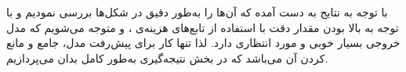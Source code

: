 
با توجه به نتایج به دست آمده که آن‌ها را به‌طور دقیق در شکل‌ها بررسی نمودیم و با توجه به بالا بودن مقدار دقت با استفاده از تابع‌های هزینه‌ی 
،
و 
متوجه می‌شویم که مدل خروجی بسیار خوبی و مورد انتظاری دارد. لذا تنها کار برای پیش‌رفت مدل، جامع و مانع کردن آن می‌باشد که در بخش نتیجه‌گیری به‌طور کامل بدان می‌پردازیم.